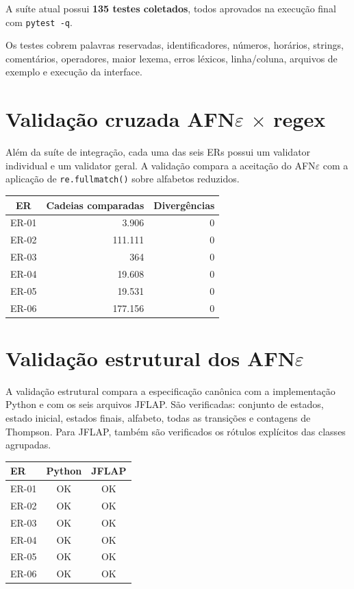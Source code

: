 \documentclass[12pt,a4paper,oneside]{report}
\begin{document}
A suíte atual possui \textbf{135 testes coletados}, todos aprovados na execução final com \texttt{pytest -q}.

Os testes cobrem palavras reservadas, identificadores, números, horários, strings, comentários, operadores, maior lexema, erros léxicos, linha/coluna, arquivos de exemplo e execução da interface.

\section{\texorpdfstring{Validação cruzada AFN$\varepsilon$ $\times$ regex}{Validação cruzada AFN epsilon x regex}}

Além da suíte de integração, cada uma das seis ERs possui um validator individual e um validator geral. A validação compara a aceitação do AFN$\varepsilon$ com a aplicação de \texttt{re.fullmatch()} sobre alfabetos reduzidos.

\begin{center}
\small
\begin{tabular}{|c|r|r|}
\toprule
ER & Cadeias comparadas & Divergências \\
\midrule
ER-01 & 3.906 & 0 \\
ER-02 & 111.111 & 0 \\
ER-03 & 364 & 0 \\
ER-04 & 19.608 & 0 \\
ER-05 & 19.531 & 0 \\
ER-06 & 177.156 & 0 \\
\bottomrule
\end{tabular}
\end{center}

\section{\texorpdfstring{Validação estrutural dos AFN$\varepsilon$}{Validação estrutural dos AFN epsilon}}

A validação estrutural compara a especificação canônica com a implementação Python e com os seis arquivos JFLAP. São verificadas: conjunto de estados, estado inicial, estados finais, alfabeto, todas as transições e contagens de Thompson. Para JFLAP, também são verificados os rótulos explícitos das classes agrupadas.

\begin{center}
\begin{tabular}{lcc}
\toprule
ER & Python & JFLAP \\
\midrule
ER-01 & OK & OK \\
ER-02 & OK & OK \\
ER-03 & OK & OK \\
ER-04 & OK & OK \\
ER-05 & OK & OK \\
ER-06 & OK & OK \\
\bottomrule
\end{tabular}
\end{center}
\end{document}
